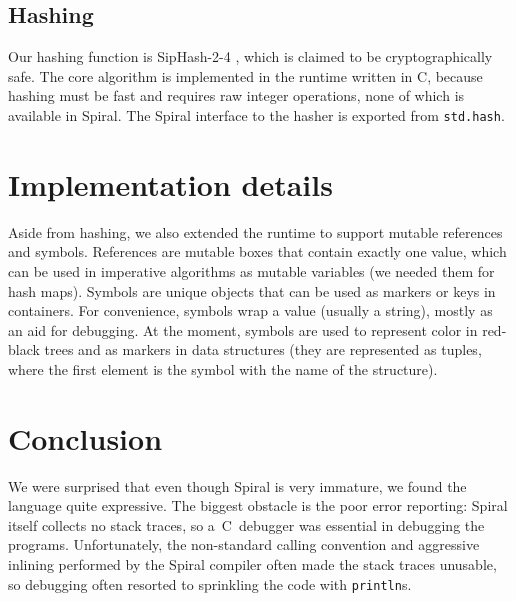 \documentclass[a4paper,9pt,oneside,twocolumn,article]{memoir}
\def\Cplusplus{{C\nolinebreak[4]\hspace{-.05em}\raisebox{.4ex}{\tiny\bfseries ++}}}
\begin{document}
\section{Hashing}

Our hashing function is SipHash-2-4 \cite{aumasson2012siphash}, which is claimed
to be cryptographically safe. The core algorithm is implemented in the runtime
written in \Cplusplus{}, because hashing must be fast and requires raw integer
operations, none of which is available in Spiral. The Spiral interface to the
hasher is exported from \texttt{std.hash}.

\chapter{Implementation details}

Aside from hashing, we also extended the runtime to support mutable references
and symbols. References are mutable boxes that contain exactly one value, which
can be used in imperative algorithms as mutable variables (we needed them for
hash maps). Symbols are unique objects that can be used as markers or keys in
containers. For convenience, symbols wrap a value (usually a string), mostly as
an aid for debugging. At the moment, symbols are used to represent color in
red-black trees and as markers in data structures (they are represented as
tuples, where the first element is the symbol with the name of the structure).

\chapter{Conclusion}

We were surprised that even though Spiral is very immature, we found the
language quite expressive. The biggest obstacle is the poor error reporting:
Spiral itself collects no stack traces, so a~C~debugger was essential in
debugging the programs. Unfortunately, the non-standard calling convention and
aggressive inlining performed by the Spiral compiler often made the stack traces
unusable, so debugging often resorted to sprinkling the code with
\texttt{println}s.

{\small \raggedright

}
\end{document}
